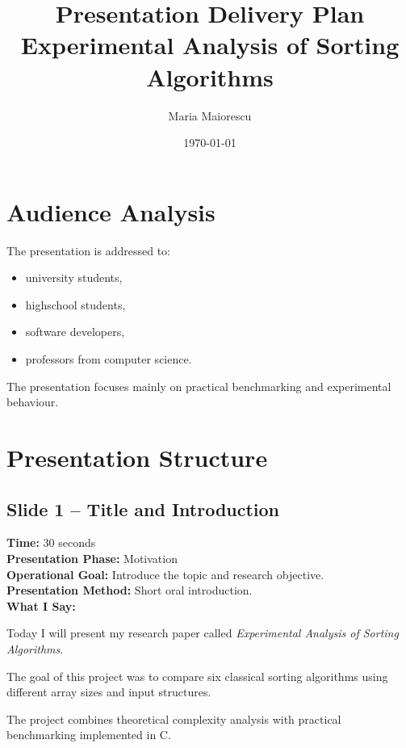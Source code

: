 \documentclass[12pt]{article}
\title{Presentation Delivery Plan\\
\large Experimental Analysis of Sorting Algorithms}
\author{Maria Maiorescu}
\date{\today}
\begin{document}
\maketitle

\section*{Audience Analysis}

The presentation is addressed to:
\begin{itemize}[leftmargin=0.7cm]
    \item university students,
    \item highschool students,
    \item software developers,
    \item professors from computer science.
\end{itemize}

The presentation focuses mainly on practical benchmarking and experimental behaviour.

\vspace{0.4cm}

\section*{Presentation Structure}

\subsection*{Slide 1 -- Title and Introduction}

\textbf{Time:} 30 seconds\\
\textbf{Presentation Phase:} Motivation\\
\textbf{Operational Goal:} Introduce the topic and research objective.\\
\textbf{Presentation Method:} Short oral introduction.\\

\textbf{What I Say:}

Today I will present my research paper called \textit{Experimental Analysis of Sorting Algorithms}.

The goal of this project was to compare six classical sorting algorithms using different array sizes and input structures.

The project combines theoretical complexity analysis with practical benchmarking implemented in C.

\vspace{0.4cm}
\end{document}
